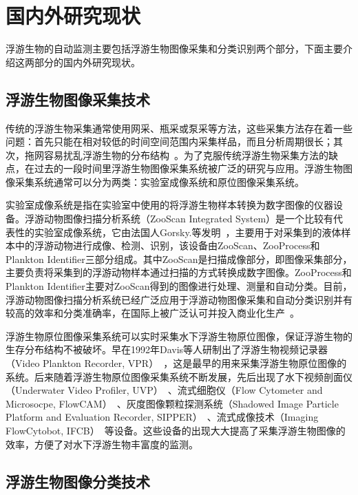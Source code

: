 \section{国内外研究现状}
\label{sec:first}

浮游生物的自动监测主要包括浮游生物图像采集和分类识别两个部分，下面主要介绍这两部分的国内外研究现状。

\subsection{浮游生物图像采集技术}

传统的浮游生物采集通常使用网采、瓶采或泵采等方法，这些采集方法存在着一些问题：首先只能在相对较低的时间空间范围内采集样品，而且分析周期很长；其次，拖网容易扰乱浮游生物的分布结构~\cite{孙晓霞2014海洋浮游生物图像观测技术及其应用}。为了克服传统浮游生物采集方法的缺点，在过去的一段时间里浮游生物图像采集系统被广泛的研究与应用。浮游生物图像采集系统通常可以分为两类：实验室成像系统和原位图像采集系统。

实验室成像系统是指在实验室中使用的将浮游生物样本转换为数字图像的仪器设备。浮游动物图像扫描分析系统（ZooScan Integrated System）是一个比较有代表性的实验室成像系统，它由法国人Gorsky.等发明~\cite{grosjean2004enumeration}，主要用于对采集到的液体样本中的浮游动物进行成像、检测、识别，该设备由ZooScan、ZooProcess和Plankton Identifier三部分组成。其中ZooScan是扫描成像部分，即图像采集部分，主要负责将采集到的浮游动物样本通过扫描的方式转换成数字图像。ZooProcess和Plankton Identifier主要对ZooScan得到的图像进行处理、测量和自动分类。目前，浮游动物图像扫描分析系统已经广泛应用于浮游动物图像采集和自动分类识别并有较高的效率和分类准确率，在国际上被广泛认可并投入商业化生产~\cite{毕永坤2011基于}。

浮游生物原位图像采集系统可以实时采集水下浮游生物原位图像，保证浮游生物的生存分布结构不被破坏。早在1992年Davis等人研制出了浮游生物视频记录器（Video Plankton Recorder, VPR）~\cite{davis1992video}，这是最早的用来采集浮游生物原位图像的系统。后来随着浮游生物原位图像采集系统不断发展，先后出现了水下视频剖面仪（Underwater Video Profiler, UVP）~\cite{davis2004real}、流式细胞仪（Flow Cytometer and Microsocpe, FlowCAM）~\cite{sieracki1998imaging}、灰度图像颗粒探测系统（Shadowed Image Particle Platform and Evaluation Recorder, SIPPER）~\cite{samson2001system}、流式成像技术（Imaging FlowCytobot, IFCB）~\cite{olson2007submersible}等设备。这些设备的出现大大提高了采集浮游生物图像的效率，方便了对水下浮游生物丰富度的监测。

\subsection{浮游生物图像分类技术}
\label{chap1:sample:table} 

